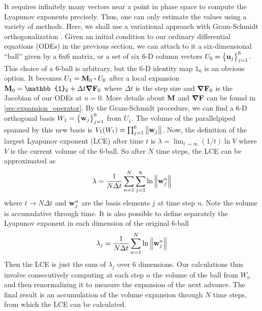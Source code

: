 It requires infinitely many vectors near a point in phase space to compute the
Lyapunov exponents precisely. Thus, one can only estimate the values using a
variety of methods. Here, we shall use a variational approach with Gram-Schmidt
orthogonalization \citep{Benettin1980,Sandri1996}. Given an initial condition to
our ordinary differential equations (ODEs) in the previous section, we can
attach to it a six-dimensional ``ball'' given by a
6x6 matrix, or a set of six 6-D column vectors $U_0=\qty{\vb{u}_j}_{j=1}^6$. This choice of a 6-ball is arbitrary, but the
6-D identity map $\mathbb{1}_6$ is an obvious option. It becomes
$U_1=\vb{M}_0\vdot{U_0}$ after a local expansion $\vb{M}_0=\mathbb{1}_6+\Delta
t\grad\vb{F}_0$ where $\Delta t$ is the step size and $\grad\vb{F}_0$ is the
Jacobian of our ODEs at $n=0$. More details about $\vb{M}$ and $\grad\vb{F}$ can be found in
\cref{sec:expansion_operator}. By the Gram-Schmidt procedure, we can find a
6-D orthogonal basis $W_1=\qty{\vb{w}_j}_{j=1}^6$ from $U_1$. The volume of the
parallelpiped spanned by this new basis is
$V_1(W_1)=\prod_{j=1}^6\norm{\vb{w}_j}$. Now, the definition of the largest
Lyapunov exponent (LCE) after time $t$ is $\lambda=\lim_{t\to\infty}(1/t)\ln
V$ where $V$ is the current volume of the 6-ball. So after $N$ time steps, the
LCE can be approximated as
\begin{equation}
    \lambda=\frac1{N\Delta t}\sum_{n=1}^N\sum_{j=1}^6\ln\norm{\vb{w}_j^n}
\end{equation}
where $t\to N\Delta t$ and $\vb{w}_j^n$ are the basis elements $j$ at time step
$n$. Note the volume is accumulative through time. It is also possible to define separately the Lyapunov exponent in each dimension of the original 6-ball
\begin{equation}
    \lambda_j=\frac1{N\Delta t}\sum_{n=1}^N\ln\norm{\vb{w}_j^n}
\end{equation}
Then the LCE is just the sum of $\lambda_j$ over 6 dimensions. Our calculations
thus involve consecutively computing at each step $n$ the volume of the ball
from $W_n$ and then renormalizing it to measure the expansion of the next
advance. The final result is an accumulation of the volume expansion through $N$
time steps, from which the LCE can be calculated.

